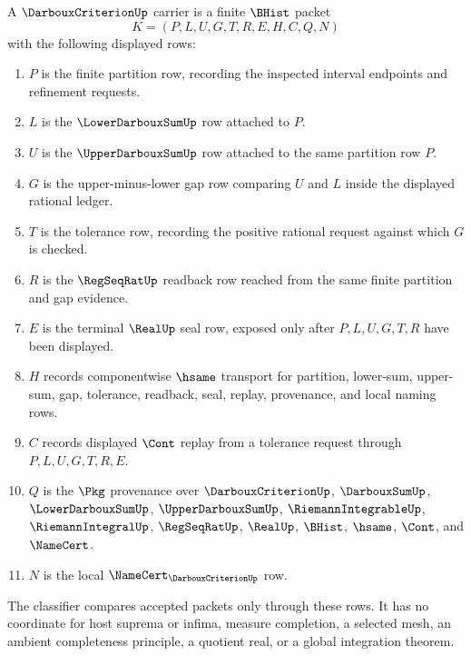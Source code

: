 \begin{definition}
\label{def:darboux-criterion-carrier}
A $\DarbouxCriterionUp$ carrier is a finite $\BHist$ packet
$$
K=(P,L,U,G,T,R,E,H,C,Q,N)
$$
with the following displayed rows:
\begin{enumerate}
\item $P$ is the finite partition row, recording the inspected interval endpoints and refinement requests.
\item $L$ is the $\LowerDarbouxSumUp$ row attached to $P$.
\item $U$ is the $\UpperDarbouxSumUp$ row attached to the same partition row $P$.
\item $G$ is the upper-minus-lower gap row comparing $U$ and $L$ inside the displayed rational ledger.
\item $T$ is the tolerance row, recording the positive rational request against which $G$ is checked.
\item $R$ is the $\RegSeqRatUp$ readback row reached from the same finite partition and gap evidence.
\item $E$ is the terminal $\RealUp$ seal row, exposed only after $P,L,U,G,T,R$ have been displayed.
\item $H$ records componentwise $\hsame$ transport for partition, lower-sum, upper-sum, gap, tolerance, readback, seal, replay, provenance, and local naming rows.
\item $C$ records displayed $\Cont$ replay from a tolerance request through $P,L,U,G,T,R,E$.
\item $Q$ is the $\Pkg$ provenance over $\DarbouxCriterionUp$, $\DarbouxSumUp$, $\LowerDarbouxSumUp$, $\UpperDarbouxSumUp$, $\RiemannIntegrableUp$, $\RiemannIntegralUp$, $\RegSeqRatUp$, $\RealUp$, $\BHist$, $\hsame$, $\Cont$, and $\NameCert$.
\item $N$ is the local $\NameCert_{\DarbouxCriterionUp}$ row.
\end{enumerate}
The classifier compares accepted packets only through these rows. It has no coordinate for host suprema or infima, measure completion, a selected mesh, an ambient completeness principle, a quotient real, or a global integration theorem.
\end{definition}

